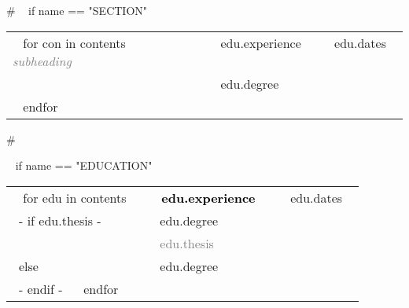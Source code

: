 

\medskip

\selectfont


\begin{minipage}{\textwidth}

{# 
~{ if name == "SECTION" }~

\begin{tabular}{ p{} %
                   p{} 
                   p{}} %
  ~{ for con in contents }~
  \small\textcolor{gray}{{\emph{ subheading }}} & {~{{ edu.experience }}~} & {\hfill \small{~{{ edu.dates }}~}}\\
  \small & {~{{ edu.degree }}~} & {\hfill} \newline\\
  ~{ endfor }~
\end{tabular}
#}



~{ if name == "EDUCATION" }~

  \begin{tabular}{ p{} 
                   p{} 
                   p{}}
  ~{ for edu in contents }~
  \small\textcolor{gray}{{\emph{  }}} & \textbf{\textcolor{black}{~{{ edu.experience }}~}} & {\hfill \small{~{{ edu.dates }}~}}\\
  ~{- if edu.thesis -}~ 
  \small & {~{{ edu.degree }}~} & {\hfill} \\
   & \small{\textcolor{gray}{~{{ edu.thesis }}~}} & {\hfill} \newline \\
  ~{else}~
   \small & {~{{ edu.degree }}~} & {\hfill} \newline\\
  ~{- endif -}~
  ~{ endfor }~
\end{tabular}



\end{minipage}
